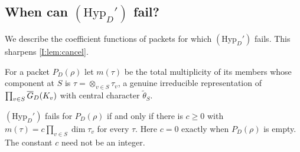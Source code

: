 \subsection{When can $(\mathrm{Hyp}_D')$ fail?}\label{II:subsec:cancel2}
We describe the coefficient functions of packets for which $(\mathrm{Hyp}_D')$ fails. This sharpens \cref{I:lem:cancel}.

For a packet $P_D(\rho)$ let $m(\tau)$ be the total multiplicity of its members whose component at $S$ is $\tau=\otimes_{v\in S}\tau_v$, a genuine irreducible representation of $\prod_{v\in S}\overline{G}_D(K_v)$ with central character $\tilde\theta_S$.

\begin{proposition}\label{II:prop:cancel2}
$(\mathrm{Hyp}_D')$ fails for $P_D(\rho)$ if and only if there is $c\ge0$ with $m(\tau)=c\prod_{v\in S}\dim\tau_v$ for every $\tau$. Here $c=0$ exactly when $P_D(\rho)$ is empty. The constant $c$ need not be an integer.
\end{proposition}
